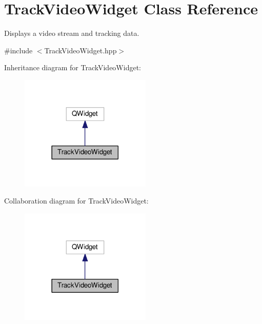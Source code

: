 \hypertarget{classTrackVideoWidget}{}\section{Track\+Video\+Widget Class Reference}
\label{classTrackVideoWidget}


Displays a video stream and tracking data.  




{\ttfamily \#include $<$Track\+Video\+Widget.\+hpp$>$}



Inheritance diagram for Track\+Video\+Widget\+:\nopagebreak
\begin{figure}[H]
\begin{center}
\leavevmode
\includegraphics[width=177pt]{classTrackVideoWidget__inherit__graph}
\end{center}
\end{figure}


Collaboration diagram for Track\+Video\+Widget\+:\nopagebreak
\begin{figure}[H]
\begin{center}
\leavevmode
\includegraphics[width=177pt]{classTrackVideoWidget__coll__graph}
\end{center}
\end{figure}
